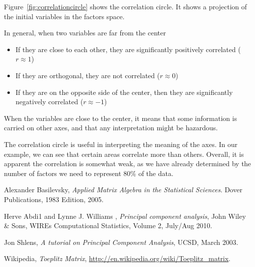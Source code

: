 \documentclass[paper=letter, fontsize=11pt, onecolunm, twoside]{scrartcl}
\begin{document}
Figure~\ref{fig:correlationcircle} shows the correlation circle.
It shows a projection of the initial variables in the factors
space.

In general, when two variables are far from the center
\begin{itemize}
 \item If they are close to each other, they are significantly
 positively correlated ($r \approx 1$)
 \item If they are orthogonal, they are not correlated ($r \approx 0$)
 \item If they are on the opposite side of the center, then they are
 significantly negatively correlated  ($r \approx -1$)
\end{itemize}

When the variables are close to the center, it means that some
information is carried on other axes, and that any interpretation
might be hazardous.

The correlation circle is useful in interpreting the meaning of the
axes. In our example, we can see that certain areas correlate more
than others. Overall, it is apparent the correlation is somewhat weak,
as we have already determined by the number of factors we need to
represent 80\% of the data.

\begin{thebibliography}{9}
  Alexander Basilevsky,
  \emph{Applied Matrix Algebra in the Statistical Sciences}.
  Dover Publications,
  1983 Edition,
  2005.

  Herve Abdi1 and Lynne J. Williams ,
  \emph{Principal component analysis}, 
  John Wiley \& Sons, WIREs Computational Statistics, Volume 2,
  July/Aug 2010.

  Jon Shlens,
  \emph{A tutorial on Principal Component Analysis},
  UCSD,
  March 2003.

  Wikipedia,
  \emph{Toeplitz Matrix},
  \url{http://en.wikipedia.org/wiki/Toeplitz_matrix}.


\end{thebibliography}
\end{document}
